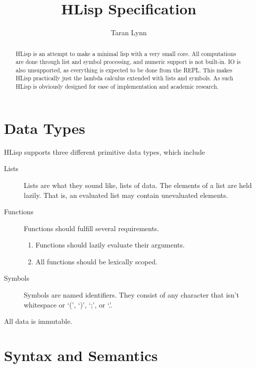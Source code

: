 \documentclass[12pt]{article}
\title{HLisp Specification}
\author{Taran Lynn}
\begin{document}
\maketitle

\begin{abstract}
  HLisp is an attempt to make a minimal lisp with a very small core. All
  computations are done through list and symbol processing, and numeric support
  is not built-in. IO is also unsupported, as everything is expected to be done
  from the REPL. This makes HLisp practically just the lambda calculus extended
  with lists and symbols. As such HLisp is obviously designed for ease of
  implementation and academic research.
\end{abstract}

\tableofcontents

\pagebreak



\section{Data Types}

HLisp supports three different primitive data types, which include

\begin{description}
\item[Lists] Lists are what they sound like, lists of data. The elements of a
  list are held lazily. That is, an evaluated list may contain unevaluated
  elements.

\item[Functions] Functions should fulfill several requirements.
  \begin{enumerate}
  \item Functions should lazily evaluate their arguments.

  \item All functions should be lexically scoped.
  \end{enumerate}

\item[Symbols] Symbols are named identifiers. They consist of any character that
  isn't whitespace or `(', `)', `;', or `.'.
\end{description}

All data is immutable.

\section{Syntax and Semantics}
\end{document}
